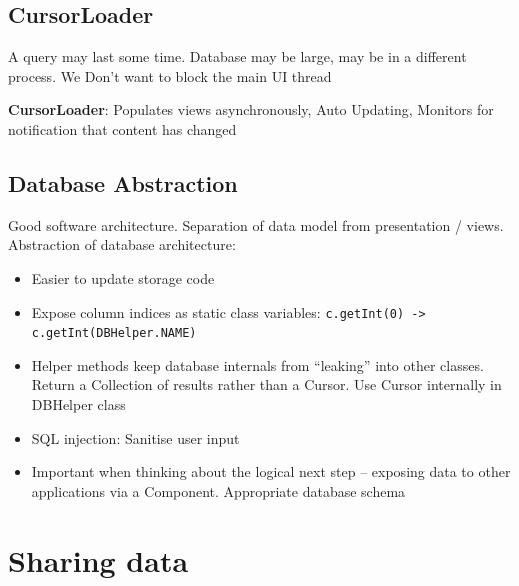 \documentclass{article}
\begin{document}
\subsection{CursorLoader}

\begin{flushleft}
  \item A query may last some time. Database may be large, may be in a different process. We Don’t want to block the main UI thread
  \item \textbf{CursorLoader}: Populates views asynchronously, Auto Updating, Monitors for notification that content has changed
\end{flushleft}

\subsection{Database Abstraction}

\begin{flushleft}
Good software architecture. Separation of data model from presentation / views. Abstraction of database architecture:
\begin{itemize}
  \item Easier to update storage code 
  \item Expose column indices as static class variables: \verb|c.getInt(0) -> c.getInt(DBHelper.NAME)|
  \item Helper methods keep database internals from “leaking” into other classes. Return a Collection of results rather than a Cursor. Use Cursor internally in DBHelper class 
  \item SQL injection: Sanitise user input 
  \item Important when thinking about the logical next step – exposing data to other applications via a Component. Appropriate database schema
\end{itemize}
\end{flushleft}

\section{Sharing data}
\end{document}
